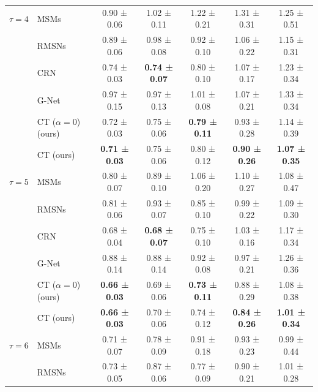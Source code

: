 \begin{tabular}{ll|ccccc}
\midrule
$\tau = 4$ & MSMs &           0.90 ± 0.06 &           1.02 ± 0.11 &           1.22 ± 0.21 &           1.31 ± 0.31 &           1.25 ± 0.51 \\
           & RMSNs &           0.89 ± 0.06 &           0.98 ± 0.08 &           0.92 ± 0.10 &           1.06 ± 0.22 &           1.15 ± 0.31 \\
           & CRN &           0.74 ± 0.03 &  \textbf{0.74 ± 0.07} &           0.80 ± 0.10 &           1.07 ± 0.17 &           1.23 ± 0.34 \\
\vspace{0.9mm}
           & G-Net &           0.97 ± 0.15 &           0.97 ± 0.13 &           1.01 ± 0.08 &           1.07 ± 0.21 &           1.33 ± 0.34 \\
           & CT ($\alpha = 0$) (ours) &           0.72 ± 0.03 &           0.75 ± 0.06 &  \textbf{0.79 ± 0.11} &           0.93 ± 0.28 &           1.14 ± 0.39 \\
           & CT (ours) &  \textbf{0.71 ± 0.03} &           0.75 ± 0.06 &           0.80 ± 0.12 &  \textbf{0.90 ± 0.26} &  \textbf{1.07 ± 0.35} \\
\midrule
$\tau = 5$ & MSMs &           0.80 ± 0.07 &           0.89 ± 0.10 &           1.06 ± 0.20 &           1.10 ± 0.27 &           1.08 ± 0.47 \\
           & RMSNs &           0.81 ± 0.06 &           0.93 ± 0.07 &           0.85 ± 0.10 &           0.99 ± 0.22 &           1.09 ± 0.30 \\
           & CRN &           0.68 ± 0.04 &  \textbf{0.68 ± 0.07} &           0.75 ± 0.10 &           1.03 ± 0.16 &           1.17 ± 0.34 \\
\vspace{0.9mm}
           & G-Net &           0.88 ± 0.14 &           0.88 ± 0.14 &           0.92 ± 0.08 &           0.97 ± 0.21 &           1.26 ± 0.36 \\
           & CT ($\alpha = 0$) (ours) &  \textbf{0.66 ± 0.03} &           0.69 ± 0.06 &  \textbf{0.73 ± 0.11} &           0.88 ± 0.29 &           1.08 ± 0.38 \\
           & CT (ours) &  \textbf{0.66 ± 0.03} &           0.70 ± 0.06 &           0.74 ± 0.12 &  \textbf{0.84 ± 0.26} &  \textbf{1.01 ± 0.34} \\
\midrule
$\tau = 6$ & MSMs &           0.71 ± 0.07 &           0.78 ± 0.09 &           0.91 ± 0.18 &           0.93 ± 0.23 &           0.99 ± 0.44 \\
           & RMSNs &           0.73 ± 0.05 &           0.87 ± 0.06 &           0.77 ± 0.09 &           0.90 ± 0.21 &           1.01 ± 0.28 \\

\end{tabular}

